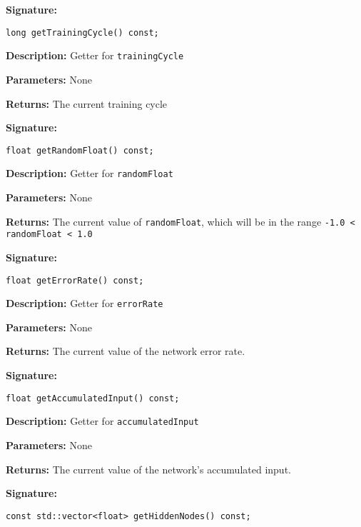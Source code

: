 \documentclass[a4paper]{article}
\begin{document}
\hrulefill %

\textbf{Signature:} \begin{lstlisting}
long getTrainingCycle() const;
\end{lstlisting}

\textbf{Description: }
Getter for \lstinline{trainingCycle}

\textbf{Parameters: } None

\textbf{Returns: }
The current training cycle

\hrulefill %

\textbf{Signature:} \begin{lstlisting}
float getRandomFloat() const;
\end{lstlisting}

\textbf{Description: }
Getter for \lstinline{randomFloat}

\textbf{Parameters: } None

\textbf{Returns: }
The current value of \lstinline{randomFloat}, which will be in the range \lstinline{-1.0 < randomFloat < 1.0}

\hrulefill %

\textbf{Signature:} \begin{lstlisting}
float getErrorRate() const;
\end{lstlisting}

\textbf{Description: }
Getter for \lstinline{errorRate}

\textbf{Parameters: } None

\textbf{Returns: }
The current value of the network error rate.

\hrulefill %

\textbf{Signature:} \begin{lstlisting}
float getAccumulatedInput() const;
\end{lstlisting}

\textbf{Description: }
Getter for \lstinline{accumulatedInput}

\textbf{Parameters: } None

\textbf{Returns: }
The current value of the network's accumulated input.

\hrulefill %

\textbf{Signature:} \begin{lstlisting}
const std::vector<float> getHiddenNodes() const;
\end{lstlisting}
\end{document}
